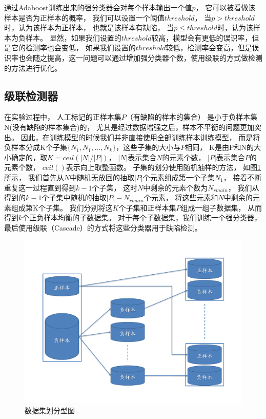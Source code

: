 通过Adaboost训练出来的强分类器会对每个样本输出一个值$p$，
它可以被看做该样本是否为正样本的概率，
我们可以设置一个阈值$threshold$，
当$p>threshold$时，认为该样本为正样本，
也就是该样本有缺陷，
当$p\leq threshold$时，认为该样本为负样本。
显然，如果我们设置的$threshold$较高，模型会有更低的误识率，但是它的检测率也会变低，
如果我们设置的$threshold$较低，检测率会变高，但是误识率也会随之提高，这一问题可以通过增加强分类器个数，使用级联的方式做检测的方法进行优化。

\subsection{级联检测器}
\label{subsection:jilianjianceqi}

在实验过程中，
人工标记的正样本集$P$（有缺陷的样本的集合）
是小于负样本集N(没有缺陷的样本集合)的，
尤其是经过数据增强之后，样本不平衡的问题更加突出。
因此，在训练模型的时候我们并非直接使用全部训练样本训练模型，
而是将负样本分成K个子集$\{N_1,N_1,\dots,N_k\}$，这些子集的大小与$P$相同，
K是由P和N的大小确定的，取$K=ceil(|N|/|P|)$，
$|N|$表示集合$N$的元素个数，
$|P|$表示集合$P$的元素个数，
$ceil()$表示向上取整函数。
子集的划分使用随机抽样的方法，
如图\ref{fig:db}所示，
我们首先从$N$中随机无放回的抽取$|P|$个元素组成第一个子集$N_1$，
接着不断重复这一过程直到得到$k-1$个子集，
这时$N$中剩余的元素个数为$N_{rmain}$，
我们从得到的$k-1$个子集中随机的抽取$|P|-N_{rmain}$个元素，
将这些元素和$N$中剩余的元素组成第K个子集。
我们分别将这$K$个子集和正样本集$P$组成一组子数据集，
从而得到$k$个正负样本均衡的子数据集。
对于每个子数据集，我们训练一个强分类器，
最后使用级联\cite{viola2001rapid}（Cascade）的方式将这些分类器用于缺陷检测。
\begin{figure}[htbp]
\centering
\includegraphics[width=0.8\linewidth]{figures/db.pdf}
\caption{数据集划分型图}
\label{fig:db}
\end{figure}

